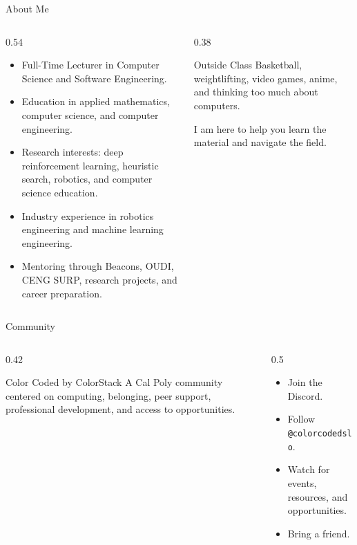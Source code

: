 \documentclass[aspectratio=169]{beamer}
\begin{document}
\begin{frame}[shrink=4]{About Me}
  \begin{columns}[T,onlytextwidth]
    \begin{column}{0.54\textwidth}
      \begin{itemize}
        \item Full-Time Lecturer in Computer Science and Software Engineering.
        \item Education in applied mathematics, computer science, and computer engineering.
        \item Research interests: deep reinforcement learning, heuristic search, robotics, and computer science education.
        \item Industry experience in robotics engineering and machine learning engineering.
        \item Mentoring through Beacons, OUDI, CENG SURP, research projects, and career preparation.
      \end{itemize}
    \end{column}
    \begin{column}{0.38\textwidth}
      \begin{block}{Outside Class}
        Basketball, weightlifting, video games, anime, and thinking too much about computers.
      \end{block}
      \begin{keyidea}
        I am here to help you learn the material and navigate the field.
      \end{keyidea}
    \end{column}
  \end{columns}
\end{frame}

\begin{frame}{Community}
  \begin{columns}[T,onlytextwidth]
    \begin{column}{0.42\textwidth}
      \begin{block}{Color Coded by ColorStack}
        A Cal Poly community centered on computing, belonging, peer support, professional development, and access to opportunities.
      \end{block}
    \end{column}
    \begin{column}{0.5\textwidth}
      \begin{itemize}
        \item Join the Discord.
        \item Follow \texttt{@colorcodedslo}.
        \item Watch for events, resources, and opportunities.
        \item Bring a friend.
      \end{itemize}
    \end{column}
  \end{columns}
\end{frame}
\end{document}
